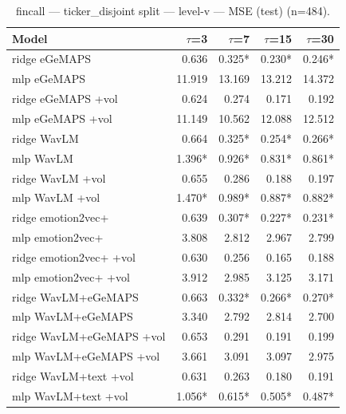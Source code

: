 \begin{table}[t]
\centering
\begin{tabular}{lrrrr}
\toprule
Model & $\tau$=3 & $\tau$=7 & $\tau$=15 & $\tau$=30 \\
\midrule
ridge eGeMAPS & 0.636 & 0.325* & 0.230* & 0.246* \\
mlp eGeMAPS & 11.919 & 13.169 & 13.212 & 14.372 \\
ridge eGeMAPS +vol & 0.624 & 0.274 & 0.171 & 0.192 \\
mlp eGeMAPS +vol & 11.149 & 10.562 & 12.088 & 12.512 \\
ridge WavLM & 0.664 & 0.325* & 0.254* & 0.266* \\
mlp WavLM & 1.396* & 0.926* & 0.831* & 0.861* \\
ridge WavLM +vol & 0.655 & 0.286 & 0.188 & 0.197 \\
mlp WavLM +vol & 1.470* & 0.989* & 0.887* & 0.882* \\
ridge emotion2vec+ & 0.639 & 0.307* & 0.227* & 0.231* \\
mlp emotion2vec+ & 3.808 & 2.812 & 2.967 & 2.799 \\
ridge emotion2vec+ +vol & 0.630 & 0.256 & 0.165 & 0.188 \\
mlp emotion2vec+ +vol & 3.912 & 2.985 & 3.125 & 3.171 \\
ridge WavLM+eGeMAPS & 0.663 & 0.332* & 0.266* & 0.270* \\
mlp WavLM+eGeMAPS & 3.340 & 2.792 & 2.814 & 2.700 \\
ridge WavLM+eGeMAPS +vol & 0.653 & 0.291 & 0.191 & 0.199 \\
mlp WavLM+eGeMAPS +vol & 3.661 & 3.091 & 3.097 & 2.975 \\
ridge WavLM+text +vol & 0.631 & 0.263 & 0.180 & 0.191 \\
mlp WavLM+text +vol & 1.056* & 0.615* & 0.505* & 0.487* \\
\bottomrule
\end{tabular}
\caption{fincall — ticker\_disjoint split — level-v — MSE (test) (n=484).}
\end{table}

